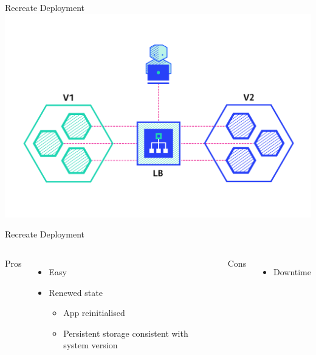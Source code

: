 \documentclass{slide}
\begin{document}

\begin{frame}{Recreate Deployment \cite{deployment-strategies}}
    \vspace{1pt}
    \centering
    \includegraphics[height=\textheight]{diagrams/recreate.png}
\end{frame}

\begin{frame}{Recreate Deployment}
    \vspace{1pt}
    \begin{columns}[t]
      \huge Pros
      {\LARGE
        \begin{itemize}
            \item Easy
            \vspace{1mm}
            \item Renewed state
            \begin{itemize}
                \Large\item App reinitialised
                \Large\item Persistent storage consistent with system version
            \end{itemize}
        \end{itemize}
      }
      \huge Cons
      {\LARGE
        \begin{itemize}
            \item Downtime
        \end{itemize}
      }
    \end{columns}
\end{frame}
\end{document}
